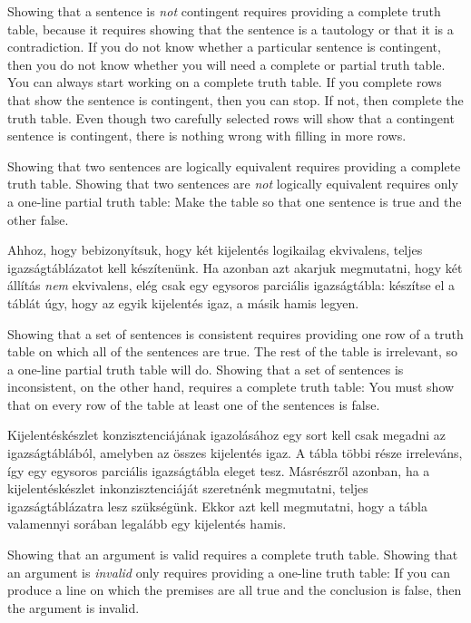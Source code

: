 Showing that a sentence is \emph{not} contingent requires providing a complete truth table, because it requires showing that the sentence is a tautology or that it is a contradiction.  If you do not know whether a particular sentence is contingent, then you do not know whether you will need a complete or partial truth table. You can always start working on a complete truth table. If you complete rows that show the sentence is contingent, then you can stop. If not, then complete the truth table. Even though two carefully selected rows will show that a contingent sentence is contingent, there is nothing wrong with filling in more rows.


Showing that two sentences are logically equivalent requires providing a complete truth table. Showing that two sentences are \emph{not} logically equivalent requires only a one-line partial truth table: Make the table so that one sentence is true and the other false.

Ahhoz, hogy bebizonyítsuk, hogy két kijelentés logikailag ekvivalens, teljes igazságtáblázatot kell készítenünk. Ha azonban azt akarjuk megmutatni, hogy két állítás \emph{nem} ekvivalens, elég csak egy egysoros parciális igazságtábla: készítse el a táblát úgy, hogy az egyik kijelentés igaz, a másik hamis legyen.

Showing that a set of sentences is consistent requires providing one row of a truth table on which all of the sentences are true. The rest of the table is irrelevant, so a one-line partial truth table will do. Showing that a set of sentences is inconsistent, on the other hand, requires a complete truth table: You must show that on every row of the table at least one of the sentences is false.

Kijelentéskészlet konzisztenciájának igazolásához egy sort kell csak megadni az igazságtáblából, amelyben az összes kijelentés igaz. A tábla többi része irreleváns, így egy egysoros parciális igazságtábla eleget tesz. Másrészről azonban, ha a kijelentéskészlet inkonzisztenciáját szeretnénk megmutatni, teljes igazságtáblázatra lesz szükségünk. Ekkor azt kell megmutatni, hogy a tábla valamennyi sorában legalább egy kijelentés hamis.

Showing that an argument is valid requires a complete truth table. Showing that an argument is \emph{invalid} only requires providing a one-line truth table: If you can produce a line on which the premises are all true and the conclusion is false, then the argument is invalid.

